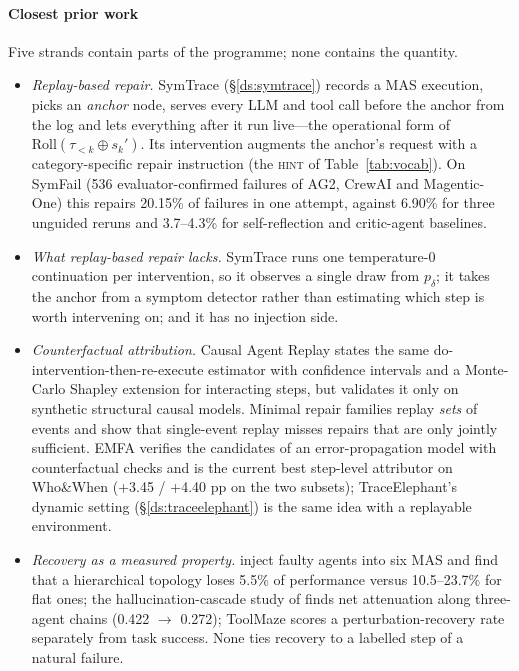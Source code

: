 \documentclass[10pt,a4paper]{article}
\begin{document}
\paragraph{Closest prior work} Five strands contain parts of the programme; none contains the quantity.
\begin{itemize}[leftmargin=1.1em]
\item \emph{Replay-based repair.} SymTrace \cite{luan2026symtrace} (\S\ref{ds:symtrace}) records a MAS execution, picks an \emph{anchor} node, serves every LLM and tool call before the anchor from the log and lets everything after it run live---the operational form of $\mathrm{Roll}(\tau_{<k}\oplus s_k')$. Its intervention augments the anchor's request with a category-specific repair instruction (the \textsc{hint} of Table~\ref{tab:vocab}). On SymFail (536 evaluator-confirmed failures of AG2, CrewAI and Magentic-One) this repairs 20.15\% of failures in one attempt, against 6.90\% for three unguided reruns and 3.7--4.3\% for self-reflection and critic-agent baselines.
\item \emph{What replay-based repair lacks.} SymTrace runs one temperature-0 continuation per intervention, so it observes a single draw from $p_\delta$; it takes the anchor from a symptom detector rather than estimating which step is worth intervening on; and it has no injection side.
\item \emph{Counterfactual attribution.} Causal Agent Replay \cite{shah2026car} states the same do-intervention-then-re-execute estimator with confidence intervals and a Monte-Carlo Shapley extension for interacting steps, but validates it only on synthetic structural causal models. Minimal repair families \cite{li2026mrfr} replay \emph{sets} of events and show that single-event replay misses repairs that are only jointly sufficient. EMFA \cite{liao2026emfa} verifies the candidates of an error-propagation model with counterfactual checks and is the current best step-level attributor on Who\&When (+3.45 / +4.40 pp on the two subsets); TraceElephant's dynamic setting (\S\ref{ds:traceelephant}) is the same idea with a replayable environment.
\item \emph{Recovery as a measured property.} \citet{huang2024resilience} inject faulty agents into six MAS and find that a hierarchical topology loses 5.5\% of performance versus 10.5--23.7\% for flat ones; the hallucination-cascade study of \citet{jamshidi2026cascade} finds net attenuation along three-agent chains (0.422 $\to$ 0.272); ToolMaze \cite{zhu2026toolmaze} scores a perturbation-recovery rate separately from task success. None ties recovery to a labelled step of a natural failure.

\end{itemize}
\end{document}
